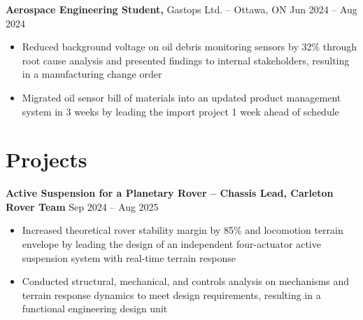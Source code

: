\documentclass[11pt]{article}       %
\newcommand{\ph}[1]{{\color{red}[#1]}}
\begin{document}
\textbf{Aerospace Engineering Student,} Gastops Ltd. -- Ottawa, ON \hfill Jun 2024 -- Aug 2024 \\
\vspace{-9pt}
\begin{itemize}
  \item Reduced background voltage on oil debris monitoring sensors by 32\% through root cause analysis and presented findings to internal stakeholders, resulting in a manufacturing change order
  \item Migrated oil sensor bill of materials into an updated product management system in 3 weeks by leading the import project 1 week ahead of schedule
\end{itemize}
 
\vspace{-20.5pt}
 
\section*{Projects}
\textbf{Active Suspension for a Planetary Rover -- Chassis Lead, Carleton Rover Team} \hfill 
\textf Sep 2024 -- Aug 2025 \\
\vspace{-9pt}
\begin{itemize}
  \item Increased theoretical rover stability margin by 85\% and locomotion terrain envelope by leading the design of an independent four-actuator active suspension system with real-time terrain response
  \item Conducted structural, mechanical, and controls analysis on mechanisms and terrain response dynamics to meet design requirements, resulting in a functional engineering design unit 
\end{itemize}
 
\end{document}

